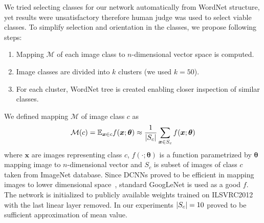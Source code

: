 We tried selecting classes for our network automatically from WordNet structure, yet results were unsatisfactory therefore human judge was used to select viable classes. To simplify selection and orientation in the classes, we propose following steps:
\begin{enumerate}
	\item Mapping $\mathcal{M}$ of each image class to $n$-dimensional vector space is computed.
	\item Image classes are divided into $k$ clusters (we used $k=50$).
	\item For each cluster, WordNet tree is created enabling closer inspection of similar classes.
\end{enumerate}
We defined mapping $\mathcal{M}$ of image class $c$ as
\begin{equation}
\mathcal{M}(c)=\mathbb{E}_{\bm{x}\in c}f(\bm{x};\bm{\theta})\approx\frac{1}{\left|{S_c}\right|}\sum_{\bm{x}\in S_c}f(\bm{x};\bm{\theta})
\end{equation}
where $\bm{x}$ are images representing class $c$, $f(\cdot;\bm{\theta})$ is a function parametrized by $\bm{\theta}$ mapping image to $n$-dimensional vector and $S_c$ is subset of images of class $c$ taken from ImageNet database. Since DCNNs proved to be efficient in mapping images to lower dimensional space~\cite{donahue2014decaf}, standard GoogLeNet is used as a good $f$. The network is initialized to publicly available weights \cite{TFmodels} trained on ILSVRC2012 with the last linear layer removed. In our experiments $\left|{S_c}\right|=10$ proved to be sufficient approximation of mean value.

